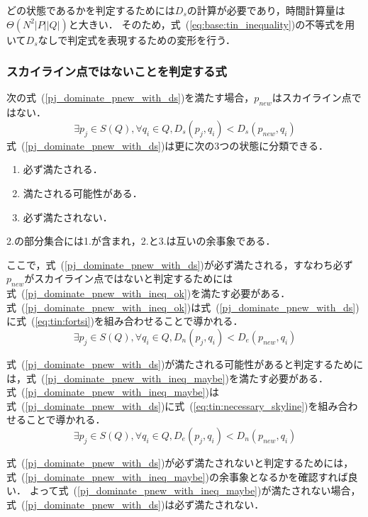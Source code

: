 \documentclass{fit}
\theoremstyle{definition}
\newcommand{\Eq}[1]{式~(#1)}
\begin{document}
どの状態であるかを判定するためには$D_s$の計算が必要であり，時間計算量は$\Theta (N^2|P||Q|)$と大きい．
そのため，\Eq{\ref{eq:base:tin_inequality}}の不等式を用いて$D_s$なしで判定式を表現するための変形を行う．

\subsubsection{スカイライン点ではないことを判定する式}\label{subsubsec:notskyline}
次の\Eq{\ref{pj_dominate_pnew_with_ds}}を満たす場合，$p_{new}$はスカイライン点ではない．
\begin{equation}
  \label{pj_dominate_pnew_with_ds}
  \exists p_j \in S(Q), \forall q_i \in Q, D_s(p_j,q_i) < D_s(p_{new},q_i)
\end{equation}
\Eq{\ref{pj_dominate_pnew_with_ds}}は更に次の3つの状態に分類できる．
\begin{enumerate}
  \item 必ず満たされる．
  \item 満たされる可能性がある．
  \item 必ず満たされない．
\end{enumerate}
2.の部分集合には1.が含まれ，2.と3.は互いの余事象である．

ここで，\Eq{\ref{pj_dominate_pnew_with_ds}}が必ず満たされる，すなわち必ず$p_{new}$がスカイライン点ではないと判定するためには\Eq{\ref{pj_dominate_pnew_with_ineq_ok}}を満たす必要がある．
\Eq{\ref{pj_dominate_pnew_with_ineq_ok}}は\Eq{\ref{pj_dominate_pnew_with_ds}}に\Eq{\ref{eq:tin:fortsi}}を組み合わせることで導かれる．
\begin{equation}
  \label{pj_dominate_pnew_with_ineq_ok}
  \exists p_j \in S(Q), \forall q_i \in Q, D_n(p_j,q_i) < D_e(p_{new}, q_i)
\end{equation}

\Eq{\ref{pj_dominate_pnew_with_ds}}が満たされる可能性があると判定するためには，\Eq{\ref{pj_dominate_pnew_with_ineq_maybe}}を満たす必要がある．
\Eq{\ref{pj_dominate_pnew_with_ineq_maybe}}は\Eq{\ref{pj_dominate_pnew_with_ds}}に\Eq{\ref{eq:tin:necessary_skyline}}を組み合わせることで導かれる．
\begin{equation}
  \label{pj_dominate_pnew_with_ineq_maybe}
  \exists p_j \in S(Q), \forall q_i \in Q, D_e(p_j,q_i) < D_n(p_{new}, q_i)
\end{equation}

\Eq{\ref{pj_dominate_pnew_with_ds}}が必ず満たされないと判定するためには，\Eq{\ref{pj_dominate_pnew_with_ineq_maybe}}の余事象となるかを確認すれば良い．
よって\Eq{\ref{pj_dominate_pnew_with_ineq_maybe}}が満たされない場合，\Eq{\ref{pj_dominate_pnew_with_ds}}は必ず満たされない．
\end{document}
